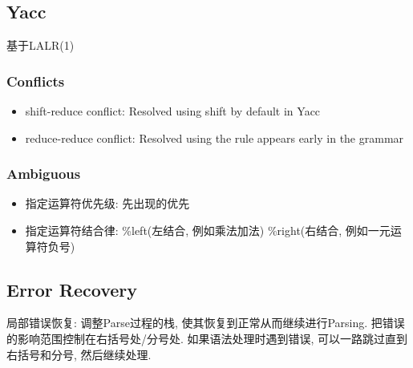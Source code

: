 \subsection{Yacc}
基于LALR(1)

\subsubsection{Conflicts}
\begin{itemize}
    \item shift-reduce conflict: Resolved using shift by default in Yacc
    \item reduce-reduce conflict: Resolved using the rule appears early in the grammar
\end{itemize}

\subsubsection{Ambiguous}
\begin{itemize}
    \item 指定运算符优先级: 先出现的优先
    \item 指定运算符结合律: \%left(左结合, 例如乘法加法) \%right(右结合, 例如一元运算符负号)
\end{itemize}

\subsection{Error Recovery}

局部错误恢复: 调整Parse过程的栈, 使其恢复到正常从而继续进行Parsing. 把错误的影响范围控制在右括号处/分号处. 如果语法处理时遇到错误, 可以一路跳过直到右括号和分号, 然后继续处理. 

